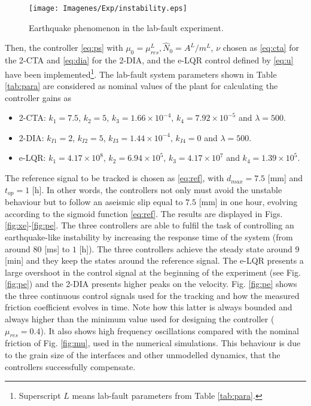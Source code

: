 \documentclass[journal,twoside,web]{ieeecolor}
\begin{document}
\begin{figure}[ht!]
  \centering 
  \texttt{[image: Imagenes/Exp/instability.eps]}
  \caption{Earthquake phenomenon in the lab-fault experiment.}
  \label{fig:earthquakelab}
\end{figure}

Then, the controller \eqref{eq:ps} with $\mu_0=\mu_{res}^L, \hat{N}_0=A^L/m^L$, $\nu$ chosen as \eqref{eq:cta} for the 2-CTA and \eqref{eq:dia} for the 2-DIA, and the e-LQR control defined by \eqref{eq:u} have been implemented\footnote{Superscript $L$ means lab-fault parameters from Table \ref{tab:para}.}. The lab-fault system parameters shown in Table \ref{tab:para} are considered as nominal values of the plant for calculating the controller gains as
\begin{itemize}
  \item 2-CTA: $k_1=7.5$, $k_2=5$, $k_3=1.66 \times 10^{-4}$, $k_4=7.92 \times 10^{-5}$ and $\lambda=500$.
  \item 2-DIA: $k_{I1}=2$, $k_{I2}=5$, $k_{I3}=1.44 \times 10^{-4}$, $k_{I4}=0$ and $\lambda=500$.
  \item e-LQR: $k_1=4.17\times 10^{8}$, $k_2=6.94\times 10^{5}$, $k_3=4.17\times 10^{7}$ and $k_4=1.39\times 10^{5}$.
  \label{expgains}
\end{itemize}

The reference signal to be tracked is chosen as \eqref{eq:ref}, with $d_{max}=7.5$ [mm] and $t_{op}=1$ [h]. In other words, the controllers not only must avoid the unstable behaviour but to follow an aseismic slip equal to $7.5$ [mm] in one hour, evolving according to the sigmoid function \eqref{eq:ref}. The results are displayed in Figs. \ref{fig:xe}-\ref{fig:pe}. The three controllers are able to fulfil the task of controlling an earthquake-like instability by increasing the response time of the system (from around $80$ [ms] to $1$ [h]). The three controllers achieve the steady state around 9 [min] and they keep the states around the reference signal. The e-LQR presents a large overshoot in the control signal at the beginning of the experiment (see Fig. \ref{fig:pe}) and the 2-DIA presents higher peaks on the velocity. Fig. \ref{fig:pe} shows the three continuous control signals used for the tracking and how the measured friction coefficient evolves in time. Note how this latter is always bounded and always higher than the minimum value used for designing the controller ($\mu_{res}=0.4$). It also shows high frequency oscillations compared with the nominal friction of Fig. \eqref{fig:mu}, used in the numerical simulations. This behaviour is due to the grain size of the interfaces and other unmodelled dynamics, that the controllers successfully compensate. 
\end{document}
